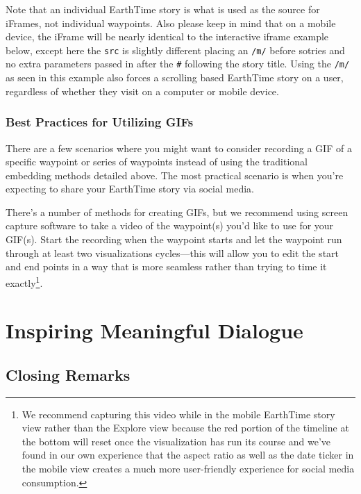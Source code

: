 \documentclass[
]{krantz}
\begin{document}
Note that an individual EarthTime story is what is used as the source for iFrames, not individual waypoints. Also please keep in mind that on a mobile device, the iFrame will be nearly identical to the interactive iframe example below, except here the \texttt{src} is slightly different placing an \texttt{/m/} before sotries and no extra parameters passed in after the \texttt{\#} following the story title. Using the \texttt{/m/} as seen in this example also forces a scrolling based EarthTime story on a user, regardless of whether they visit on a computer or mobile device.

\hypertarget{best-practices-for-utilizing-gifs}{%
\section{Best Practices for Utilizing GIFs}\label{best-practices-for-utilizing-gifs}}

There are a few scenarios where you might want to consider recording a GIF of a specific waypoint or series of waypoints instead of using the traditional embedding methods detailed above. The most practical scenario is when you're expecting to share your EarthTime story via social media.

There's a number of methods for creating GIFs, but we recommend using screen capture software to take a video of the waypoint(s) you'd like to use for your GIF(s). Start the recording when the waypoint starts and let the waypoint run through at least two visualizations cycles---this will allow you to edit the start and end points in a way that is more seamless rather than trying to time it exactly\footnote{We recommend capturing this video while in the mobile EarthTime story view rather than the Explore view because the red portion of the timeline at the bottom will reset once the visualization has run its course and we've found in our own experience that the aspect ratio as well as the date ticker in the mobile view creates a much more user-friendly experience for social media consumption.}.

\hypertarget{part-inspiring-meaningful-dialogue}{%
\part{Inspiring Meaningful Dialogue}\label{part-inspiring-meaningful-dialogue}}

\hypertarget{closing-remarks}{%
\chapter{Closing Remarks}\label{closing-remarks}}
\end{document}
